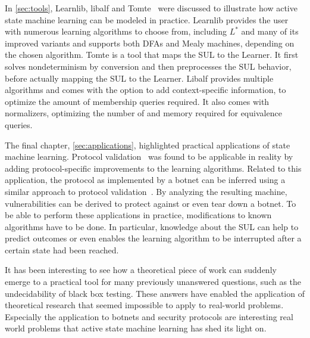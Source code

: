 \documentclass[multi,crop=false,class=article]{standalone}
\begin{document}
In \cref{sec:tools}, Learnlib, libalf and Tomte~\cite{Raffelt2009,Bollig2010,Tomte2014}
were discussed to illustrate how active state machine learning can be modeled in
practice. Learnlib provides the user with numerous learning algorithms to choose
from, including $L^*$ and many of its improved variants and supports both DFAs
and Mealy machines, depending on the chosen algorithm. Tomte is a tool that maps
the SUL to the Learner. It first solves nondeterminism by conversion and then
preprocesses the SUL behavior, before actually mapping the SUL to the Learner.
Libalf provides multiple algorithms and comes with the option to add
context-specific information, to optimize the amount of membership queries
required. It also comes with normalizers, optimizing the number of and memory
required for equivalence queries.

The final chapter, \cref{sec:applications}, highlighted practical applications of state
machine learning. Protocol validation~\cite{deRuiter2015} was found to be
applicable in reality by adding protocol-specific improvements to the
learning algorithms. Related to this application, the protocol as implemented
by a botnet can be inferred using a similar approach to protocol
validation~\cite{Cho2010}. By analyzing the resulting machine, vulnerabilities
can be derived to protect against or even tear down a botnet.
To be able to perform these applications in practice, modifications to known
algorithms have to be done. In particular, knowledge about the SUL can help to
predict outcomes or even enables the learning algorithm to be interrupted after
a certain state had been reached.

It has been interesting to see how a theoretical piece of work can suddenly
emerge to a practical tool for many previously unanswered questions, such as the
undecidability of black box testing. These answers have enabled the
application of theoretical research that seemed impossible to apply to real-world
problems. Especially the application to botnets and security protocols are
interesting real world problems that active state machine learning has shed its
light on.
\end{document}
